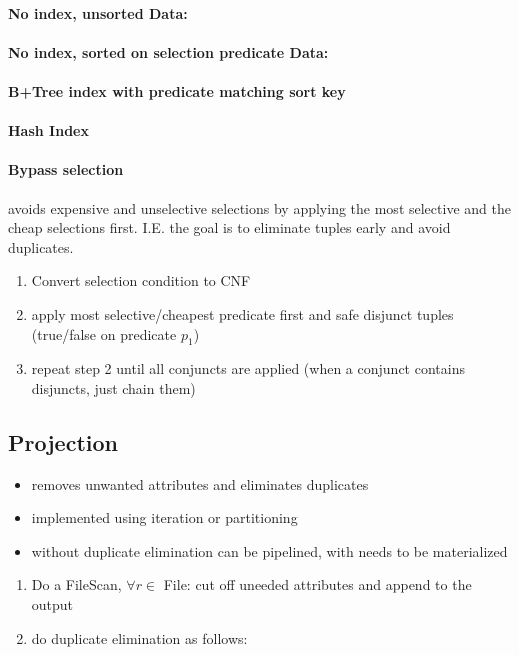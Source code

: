  \paragraph{No index, unsorted Data:}
 
\paragraph{No index, sorted on selection predicate Data:}
  
\paragraph{B+Tree index with predicate matching sort key}

\paragraph{Hash Index}

 \paragraph{Bypass selection} avoids expensive and unselective selections by applying the most selective and the cheap selections first. I.E. the goal is to eliminate tuples early and avoid duplicates.
 \begin{enumerate}
     \item Convert selection condition to CNF
     \item apply most selective/cheapest predicate first and safe disjunct tuples (true/false on predicate $p_1$) 
     \item repeat step 2 until all conjuncts are applied (when a conjunct contains disjuncts, just chain them)
 \end{enumerate}
 
 
 \subsection{Projection}
 \begin{itemize}
     \item removes unwanted attributes and eliminates duplicates
     \item implemented using iteration or partitioning
     \item without duplicate elimination can be pipelined, with needs to be materialized
 \end{itemize}
 \begin{enumerate}
     \item Do a FileScan, $\forall r \in $ File: cut off uneeded attributes and append to the output
     \item do duplicate elimination as follows:
 \end{enumerate}
   
